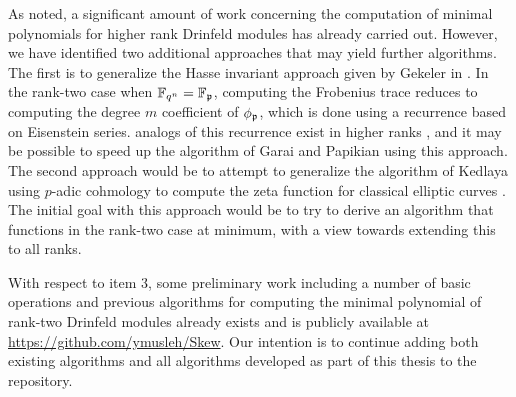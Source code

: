 As noted, a significant amount of work concerning the computation of minimal polynomials for higher rank Drinfeld modules has already carried out. However, we have identified two additional approaches that may yield further algorithms. The first is to generalize the Hasse invariant approach given by Gekeler in \cite{frobdist}. In the rank-two case when $\mathbb{F}_{q^n} = \mathbb{F}_{\mathfrak{p}}$, computing the Frobenius trace reduces to computing the degree $m$ coefficient of $\phi_{\mathfrak{p}}$, which is done using a recurrence based on Eisenstein series. analogs of this recurrence exist in higher ranks \cite{Gekeler1988}, and it may be possible to speed up the algorithm of Garai and Papikian using this approach. The second approach would be to attempt to generalize the algorithm of Kedlaya using $p$-adic cohmology to compute the zeta function for classical elliptic curves \cite{kedlaya01}. The initial goal with this approach would be to try to derive an algorithm that functions in the rank-two case at minimum, with a view towards extending this to all ranks.

With respect to item 3, some preliminary work including a number of basic operations and previous algorithms for computing the minimal polynomial of rank-two Drinfeld modules already exists and is publicly available at \url{https://github.com/ymusleh/Skew}. Our intention is to continue adding both existing algorithms and all algorithms developed as part of this thesis to the repository.
